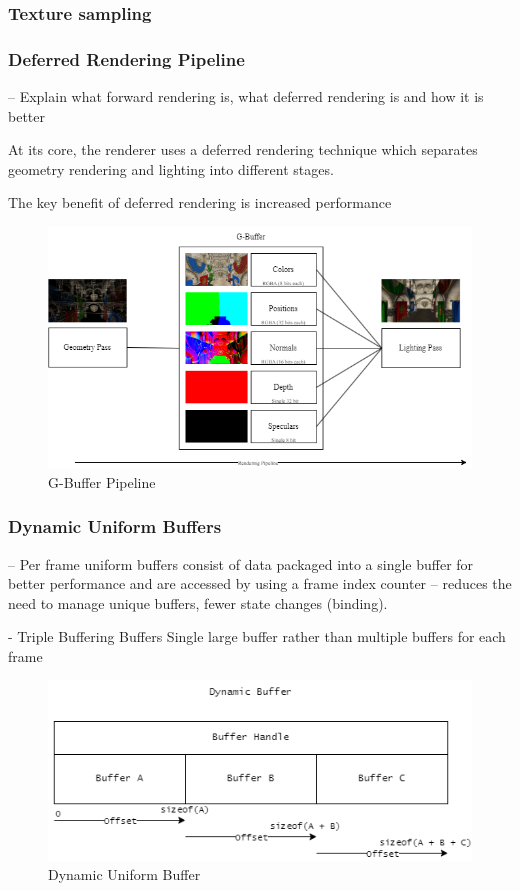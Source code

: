 \documentclass[11pt]{article}
\begin{document}
\subsubsection{Texture sampling}

\subsubsection{Deferred Rendering Pipeline}

-- Explain what forward rendering is, what deferred rendering is and how it is better

At its core, the renderer uses a deferred rendering technique which separates geometry rendering and
lighting into different stages. 

The key benefit of deferred rendering is increased performance 

\begin{figure}[h!]
  \centering
  \includegraphics[width=\textwidth]{images/g_buffer.png}
  \caption{G-Buffer Pipeline}
  \label{fig:g_buffer}
\end{figure}

\subsubsection{Dynamic Uniform Buffers}
-- Per frame uniform buffers consist of data packaged into a single buffer for 
better performance and are accessed by using a frame index counter
-- reduces the need to manage unique buffers, fewer state changes (binding).

-   Triple Buffering Buffers Single large buffer rather than multiple buffers for each frame

\begin{figure}[h!]
  \centering
  \includegraphics[width=\textwidth]{images/dynamic_buffer.png}
  \caption{Dynamic Uniform Buffer}
  \label{fig:dynamic_uniform_buffer}
\end{figure}
\end{document}
